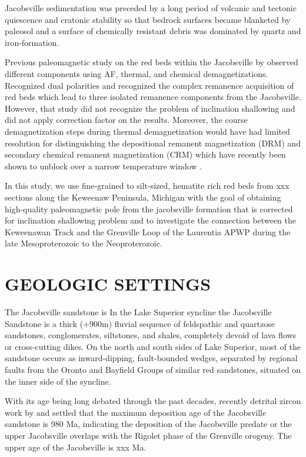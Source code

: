 \documentclass[draft]{agujournal2019}
\begin{document}
Jacobsville sedimentation was preceded by a long period of volcanic and tectonic quiescence and cratonic stability so that bedrock surfaces became blanketed by paleosol and a surface of chemically resistant debris was dominated by quartz and iron-formation. 

Previous paleomagnetic study on the red beds within the Jacobsville by \cite{Roy1978a} observed different components using AF, thermal, and chemical demagnetizations. Recognized dual polarities and recognized the complex remanence acquisition of red beds which lead to three isolated remanence components from the Jacobsville. However, that study did not recognize the problem of inclination shallowing and did not apply correction factor on the results. Moreover, the course demagnetization steps during thermal demagnetization would have had limited resolution for distinguishing the depositional remanent magnetization (DRM) and secondary chemical remanent magnetization (CRM) which have recently been shown to unblock over a narrow temperature window \cite{Swanson-Hysell2019b}. 

In this study, we use fine-grained to silt-sized, hematite rich red beds from xxx sections along the Keweenaw Peninsula, Michigan with the goal of obtaining high-quality paleomagnetic pole from the jacobsville formation that is corrected for inclination shallowing problem and to investigate the connection between the Keweenawan Track and the Grenville Loop of the Laurentia APWP during the late Mesoproterozoic to the Neoproterozoic. 

\section*{GEOLOGIC SETTINGS}


The Jacobsville sandstone is 
\cite{Kalliokoski1982a} In the Lake Superior syncline the Jacobsville Sandstone is a thick (+900m) fluvial sequence of feldspathic and quartzose sandstones, conglomerates, siltstones, and shales, completely devoid of lava flows or cross-cutting dikes. On the north and south sides of Lake Superior, most of the sandstone occurs as inward-dipping, fault-bounded wedges, separated by regional faults from the Oronto and Bayfield Groups of similar red sandstones, situated on the inner side of the syncline. 

With its age being long debated through the past decades, recently detrital zircon work by \cite{Malone2016a} and  settled that the maximum deposition age of the Jacobsville sandstone  is 980 Ma, indicating the deposition of the Jacobsville predate or the upper Jacobsville overlaps with the Rigolet phase of the Grenville orogeny. The upper age of the Jacobsville is xxx Ma.
\end{document}
